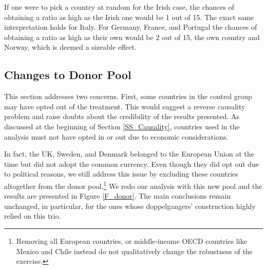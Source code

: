 \documentclass[12pt]{article}
\begin{document}
If one were to pick a country at random for the Irish case, the chances of obtaining a ratio as high as the Irish one would be 1 out of 15. The exact same interpretation holds for Italy. For Germany, France, and Portugal the chances of obtaining a ratio as high as their own would be 2 out of 15, the own country and Norway, which is deemed a sizeable effect.


\subsection{Changes to Donor Pool \label{SS_donor}}

This section addresses two concerns. First, some countries in the control group may have opted out of the treatment. This would suggest a reverse causality problem and raise doubts about the credibility of the results presented. As discussed at the beginning of Section \ref{SS_Causality}, countries used in the analysis must not have opted in or out due to economic considerations. 

In fact, the UK, Sweden, and Denmark belonged to the European Union at the time but did not adopt the common currency. Even though they did opt out due to political reasons, we still address this issue by excluding these countries altogether from the donor pool.\footnote{Removing all European countries, or middle-income OECD countries like Mexico and Chile instead do not qualitatively change the robustness of the exercise.} We redo our analysis with this new pool and the results are presented in Figure \ref{F_donor}. The main conclusions remain unchanged, in particular, for the ones whose doppelgangers' construction highly relied on this trio.
\end{document}
